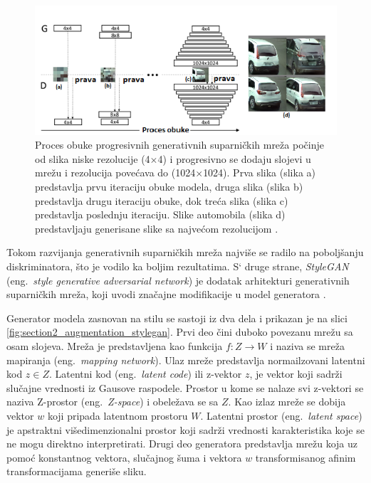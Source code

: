 \documentclass[12pt,oneside]{memoir}
\begin{document}
\begin{figure}[ht]
    \centering
    \includegraphics[width=1\textwidth]{matfmaster/glava2/progressive_gan.png}
    \caption{Proces obuke progresivnih generativnih suparničkih mreža počinje od slika niske rezolucije (4\(\times\)4) i progresivno se dodaju slojevi u mrežu i rezolucija povećava do (1024\(\times\)1024). Prva slika (slika a) predstavlja prvu iteraciju obuke modela, druga slika (slika b) predstavlja drugu iteraciju obuke, dok treća slika (slika c) predstavlja poslednju iteraciju. Slike automobila (slika d) predstavljaju generisane slike sa najvećom rezolucijom \cite{karras2017progressive}. }
    \label{fig:section2_augmentation_progressivegans}
\end{figure}

Tokom razvijanja generativnih suparničkih mreža najviše se radilo na poboljšanju diskriminatora, što je vodilo ka boljim rezultatima. S` druge strane, \textit{StyleGAN} (eng.~\textit{style generative adversarial network}) je dodatak arhitekturi generativnih suparničkih mreža, koji uvodi značajne modifikacije u model generatora \cite{karras2019style}. 

Generator modela zasnovan na stilu se sastoji iz dva dela i prikazan je na slici \ref{fig:section2_augmentation_stylegan}. Prvi deo čini duboko povezanu mrežu sa osam slojeva. Mreža je predstavljena kao funkcija \(f: Z\to W\) i naziva se mreža mapiranja (eng.~\textit{mapping network}). Ulaz mreže predstavlja normailzovani latentni kod \(z \in Z\). Latentni kod (eng.~\textit{latent code}) ili z-vektor \(z\), je vektor koji sadrži slučajne vrednosti iz Gausove raspodele. Prostor u kome se nalaze svi z-vektori se naziva Z-prostor (eng.~\textit{Z-space}) i obeležava se sa \(Z\). Kao izlaz mreže se dobija vektor \(w\) koji pripada latentnom prostoru \(W\). Latentni prostor (eng.~\textit{latent space}) je apstraktni višedimenzionalni prostor koji sadrži vrednosti karakteristika koje se ne mogu direktno interpretirati. Drugi deo generatora predstavlja mrežu koja uz pomoć konstantnog vektora, slučajnog šuma i vektora \(w\) transformisanog afinim transformacijama generiše sliku.
\end{document}
